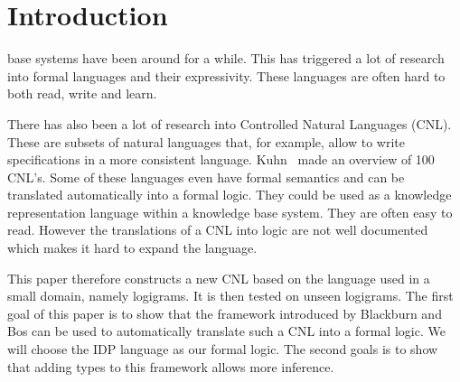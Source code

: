\section{Introduction}

 base systems have been around for a while. This has triggered a lot of research into formal languages and their expressivity. These languages are often hard to both read, write and learn.

There has also been a lot of research into Controlled Natural Languages (CNL). These are subsets of natural languages that, for example, allow to write specifications in a more consistent language. Kuhn~\cite{Kuhn2014} made an overview of 100 CNL's. Some of these languages even have formal semantics and can be translated automatically into a formal logic. They could be used as a knowledge representation language within a knowledge base system. They are often easy to read. However the translations of a CNL into logic are not well documented which makes it hard to expand the language.

This paper therefore constructs a new CNL based on the language used in a small domain, namely logigrams. It is then tested on unseen logigrams. The first goal of this paper is to show that the framework introduced by Blackburn and Bos \cite{Blackburn2005, Blackburn2006} can be used to automatically translate such a CNL into a formal logic. We will choose the IDP \cite{IDP} language as our formal logic. The second goals is to show that adding types to this framework allows more inference.
